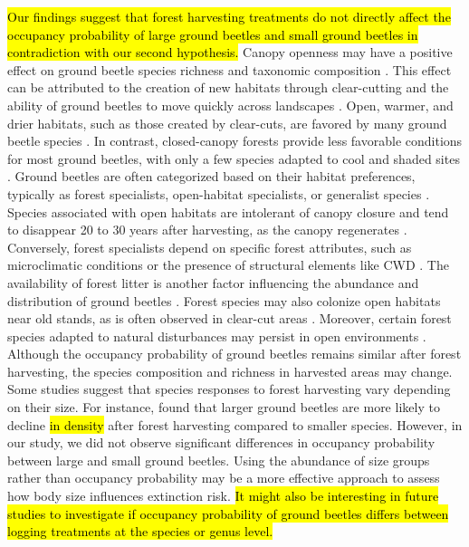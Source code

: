 \hl{Our findings suggest that forest harvesting treatments do not directly affect the occupancy probability of large ground beetles and small ground beetles in contradiction with our second hypothesis. }
Canopy openness may have a positive effect on ground beetle species richness and taxonomic composition \citep{Halme1993Carabidbeetles,Heliola2001Distributioncarabid,Koivula2002Alternativeharvesting}. 
This effect can be attributed to the creation of new habitats through clear-cutting and the ability of ground beetles to move quickly across landscapes \citep{Niemela2007effectsforestry}. 
Open, warmer, and drier habitats, such as those created by clear-cuts, are favored by many ground beetle species \citep{Niemela2007effectsforestry}. 
In contrast, closed-canopy forests provide less favorable conditions for most ground beetles, with only a few species adapted to cool and shaded sites \citep{Niemela1993Effectsclearcut,koivulaBorealCarabidbeetleColeoptera2002a}. 
Ground beetles are often categorized based on their habitat preferences, typically as forest specialists, open-habitat specialists, or generalist species \citep{Niemela2007effectsforestry}. 
Species associated with open habitats are intolerant of canopy closure and tend to disappear 20 to 30 years after harvesting, as the canopy regenerates \citep{Niemela1996importancesmallscale,Koivula2002Alternativeharvesting}. 
Conversely, forest specialists depend on specific forest attributes, such as microclimatic conditions or the presence of structural elements like CWD \citep{Niemela1996importancesmallscale,Heliola2001Distributioncarabid,Koivula2002Alternativeharvesting,Work2004Standcomposition}. 
The availability of forest litter is another factor influencing the abundance and distribution of ground beetles \citep{koivula.LeafLitterSmallscale1999,Heliola2001Distributioncarabid,Magura2005ImpactsLeaflitter}. 
Forest species may also colonize open habitats near old stands, as is often observed in clear-cut areas \citep{Spence1996Northernforestry,Koivula2002Alternativeharvesting}. 
Moreover, certain forest species adapted to natural disturbances may persist in open environments \citep{Niemela2007effectsforestry}. 
Although the occupancy probability of ground beetles remains similar after forest harvesting, the species composition and richness in harvested areas may change. 
Some studies suggest that species responses to forest harvesting vary depending on their size. 
For instance, \cite{Nolte2019Habitatspecialization} found that larger ground beetles are more likely to decline \hl{in density} after forest harvesting compared to smaller species. 
However, in our study, we did not observe significant differences in occupancy probability between large and small ground beetles. 
Using the abundance of size groups rather than occupancy probability may be a more effective approach to assess how body size influences extinction risk.
\hl{It might also be interesting in future studies to investigate if occupancy probability of ground beetles differs between logging treatments at the species or genus level.}

